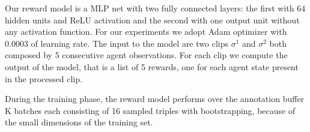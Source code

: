 Our reward model is a MLP net with two fully connected layers: the first with 64 hidden units and ReLU activation and the second with one output unit without any activation function. For our experiments we adopt Adam optimizer with $0.0003$ of learning rate.
The input to the model are two clips $\sigma^1$ and $\sigma^2$ both composed by 5 consecutive agent observations. For each clip we compute the output of the model, that is a list of 5 rewards, one for each agent state present in the processed clip. 

During the training phase, the reward model performs over the annotation buffer K batches each consisting of 16 sampled triples with bootstrapping, because of the small dimensions of the training set. 

